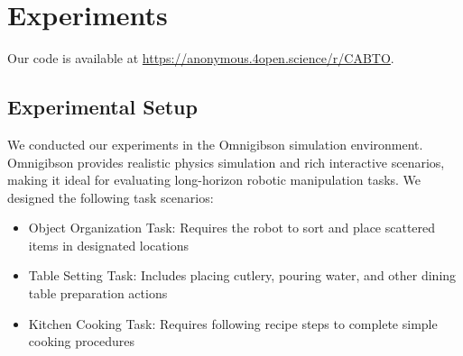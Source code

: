 \documentclass{article}
\begin{document}




\section{Experiments}

Our code is available at \href{https://anonymous.4open.science/r/CABTO}{https://anonymous.4open.science/r/CABTO}.


\subsection{Experimental Setup}

We conducted our experiments in the Omnigibson simulation environment. Omnigibson provides realistic physics simulation and rich interactive scenarios, making it ideal for evaluating long-horizon robotic manipulation tasks. We designed the following task scenarios:

\begin{itemize}
    \item Object Organization Task: Requires the robot to sort and place scattered items in designated locations
    \item Table Setting Task: Includes placing cutlery, pouring water, and other dining table preparation actions
    \item Kitchen Cooking Task: Requires following recipe steps to complete simple cooking procedures
\end{itemize}

\end{document}
